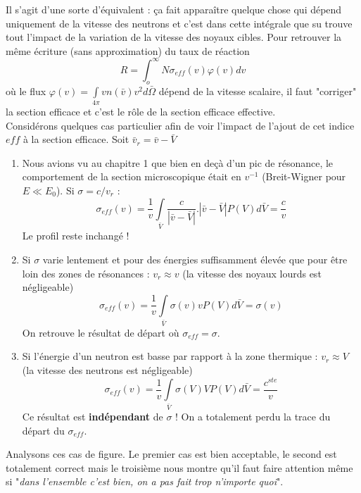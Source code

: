 	Il s'agit d'une sorte d'équivalent : ça fait apparaître quelque chose qui dépend uniquement de la
	vitesse des neutrons et c'est dans cette intégrale que su trouve tout l'impact de la variation 
	de la vitesse des noyaux cibles. Pour retrouver la même écriture (sans approximation) du taux 
	de réaction
	\begin{equation}
	R = \int_o^\infty     N{\sigma _{eff}}(v)\varphi (v)dv
	\end{equation}
	où le flux $\varphi (v) = \int\limits_{4\pi }  vn(\bar v){v^2}d\bar \Omega $  dépend de la vitesse
	scalaire, il faut "corriger" la section efficace et c'est le rôle de la section efficace 
	effective.\\
	
	Considérons quelques cas particulier afin de voir l'impact de l'ajout de cet indice $eff$ à la 
	section efficace. Soit $\bar v_r = \bar v -\bar V$
	\begin{enumerate}
	\item Nous avions vu au chapitre 1 que bien en deçà d'un pic de résonance, le comportement 
	de la section microscopique était en $v^{-1}$ (Breit-Wigner pour $E\ll E_0$). Si $\sigma = 
	c/v_r$ :
	\begin{equation}
	{\sigma _{eff}}(v) = \frac{1}{v}\int\limits_{\bar V}  \frac{c}{{|\bar v - \bar V|}}.|\bar v -
	 \bar V|P(V)d\bar V = \frac{c}{v}
	\end{equation}
	Le profil reste inchangé !
	\item Si $\sigma$ varie lentement et pour des énergies suffisamment élevée que pour être loin 
	des zones de résonances : $v_r \approx v$ (la vitesse des noyaux lourds est négligeable)
	\begin{equation}
	{\sigma _{eff}}(v) = \frac{1}{v}\int\limits_{\bar V}    \sigma (v)vP(V)d\bar V = \sigma (v)
	\end{equation}
	On retrouve le résultat de départ où $\sigma_{eff}=\sigma$.
	\item Si l'énergie d'un neutron est basse par rapport à la zone thermique : $v_r\approx V$ 
	(la vitesse des neutrons est négligeable)
	\begin{equation}
	{\sigma _{eff}}(v) = \frac{1}{v}\int\limits_{\bar V}   \sigma (V)VP(V)d\bar V =
	 \frac{{{c^{ste}}}}{v}
	\end{equation}
	Ce résultat est \textbf{indépendant} de $\sigma$ !  On a totalement perdu la trace du départ
	du $\sigma_{eff}$.
	\end{enumerate}
	
	Analysons ces cas de figure. Le premier cas est bien acceptable, le second est totalement 
	correct mais le troisième nous montre qu'il faut faire attention même si "\textit{dans l'ensemble 
	c'est bien, on a pas fait trop n'importe quoi}".
	
